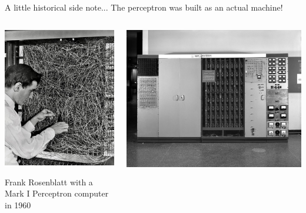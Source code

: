 \documentclass[9pt, aspectratio=169]{beamer}
\begin{document}
\begin{frame}
    {A little historical side note...}
    The perceptron was built as an actual machine!

    \begin{columns}
        \begin{column}{.5\textwidth}
            \centering
            \includegraphics[height=.7\textheight]{MarkI_perceptron.jpg}

            \footnotesize
            Frank Rosenblatt with a Mark I Perceptron computer in 1960
        \end{column}
        \begin{column}{.5\textwidth}
            \centering
            \includegraphics[height=.7\textheight]{MarkI_perceptron_2.jpg}


\end{column}
\end{columns}
\end{frame}
\end{document}
